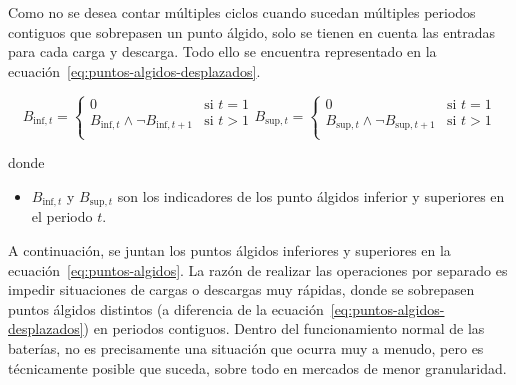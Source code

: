 Como no se desea contar múltiples ciclos cuando sucedan múltiples periodos contiguos que sobrepasen un punto álgido, solo se tienen en cuenta las entradas para cada carga y descarga. Todo ello se encuentra representado en la ecuación~\ref{eq:puntos-algidos-desplazados}.

\begin{samepage}

  \begin{subequations}%
    \label{eq:puntos-algidos-desplazados}

    \begin{equation}
      B_{\text{inf}, t} =
      \begin{cases}
        0                                                  & \text{si } t = 1 \\
        B_{\text{inf}, t} \land \neg B_{\text{inf}, t + 1} & \text{si } t > 1 \\
      \end{cases}
    \end{equation}

    \begin{equation}
      B_{\text{sup}, t} =
      \begin{cases}
        0                                                  & \text{si } t = 1 \\
        B_{\text{sup}, t} \land \neg B_{\text{sup}, t + 1} & \text{si } t > 1 \\
      \end{cases}
    \end{equation}

  \end{subequations}

  donde

  \begin{itemize}

    \item \( B_{\text{inf}, t} \) y \( B_{\text{sup}, t} \) son los indicadores de los punto álgidos inferior y superiores en el periodo \( t \).

  \end{itemize}

\end{samepage}

A continuación, se juntan los puntos álgidos inferiores y superiores en la ecuación~\ref{eq:puntos-algidos}. La razón de realizar las operaciones por separado es impedir situaciones de cargas o descargas muy rápidas, donde se sobrepasen puntos álgidos distintos (a diferencia de la ecuación~\ref{eq:puntos-algidos-desplazados}) en periodos contiguos. Dentro del funcionamiento normal de las baterías, no es precisamente una situación que ocurra muy a menudo, pero es técnicamente posible que suceda, sobre todo en mercados de menor granularidad.

